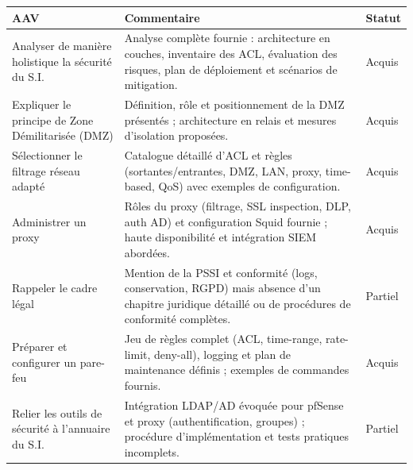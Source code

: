 \begin{center}
\setlength{\tabcolsep}{10pt}
\begin{tabular}{|p{}|p{}|m{}|}
\hline
\textbf{AAV} & \textbf{Commentaire} & \textbf{Statut} \\ \hline

Analyser de manière holistique la sécurité du S.I. &
Analyse complète fournie : architecture en couches, inventaire des ACL, évaluation des risques, plan de déploiement et scénarios de mitigation. &
{\color{green!60!black}Acquis} \\ \hline

Expliquer le principe de Zone Démilitarisée (DMZ) &
Définition, rôle et positionnement de la DMZ présentés ; architecture en relais et mesures d'isolation proposées. &
{\color{green!60!black}Acquis} \\ \hline

Sélectionner le filtrage réseau adapté &
Catalogue détaillé d'ACL et règles (sortantes/entrantes, DMZ, LAN, proxy, time-based, QoS) avec exemples de configuration. &
{\color{green!60!black}Acquis} \\ \hline

Administrer un proxy &
Rôles du proxy (filtrage, SSL inspection, DLP, auth AD) et configuration Squid fournie ; haute disponibilité et intégration SIEM abordées. &
{\color{green!60!black}Acquis} \\ \hline

Rappeler le cadre légal &
Mention de la PSSI et conformité (logs, conservation, RGPD) mais absence d'un chapitre juridique détaillé ou de procédures de conformité complètes. &
{\color{orange}Partiel} \\ \hline

Préparer et configurer un pare-feu &
Jeu de règles complet (ACL, time-range, rate-limit, deny-all), logging et plan de maintenance définis ; exemples de commandes fournis. &
{\color{green!60!black}Acquis} \\ \hline

Relier les outils de sécurité à l'annuaire du S.I. &
Intégration LDAP/AD évoquée pour pfSense et proxy (authentification, groupes) ; procédure d'implémentation et tests pratiques incomplets. &
{\color{orange}Partiel} \\ \hline

\end{tabular}
\end{center}

\newpage

